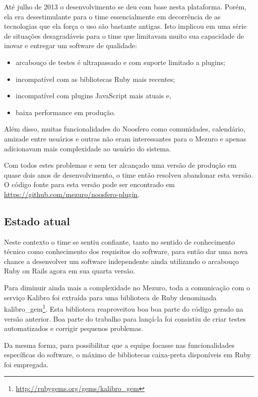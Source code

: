 \documentclass[12pt]{article}
\begin{document}
  Até julho de 2013 o desenvolvimento se deu com base nesta plataforma. Porém, ela era desestimulante para o time essencialmente em decorrência de as tecnologias que ela força o uso são bastante antigas. Isto implicou em uma série de situações desagradáveis para o time que limitavam muito sua capacidade de inovar e entregar um software de qualidade:

  \begin{itemize}
    \item arcabouço de testes é ultrapassado e com suporte limitado a plugins;
    \item incompatível com as bibliotecas Ruby mais recentes;
    \item incompatível com plugins JavaScript mais atuais e,
    \item baixa performance em produção.
  \end{itemize}

  Além disso, muitas funcionalidades do Noosfero como comunidades, calendário, amizade entre usuários e outras não eram interessantes para o Mezuro e apenas adicionavam mais complexidade ao usuário do sistema.

  Com todos estes problemas e sem ter alcançado uma versão de produção em quase dois anos de desenvolvimento, o time então resolveu abandonar esta versão. O código fonte para esta versão pode ser encontrado em \url{https://github.com/mezuro/noosfero-plugin}.

  \subsection{Estado atual} \label{subsec:estado-atual}
  Neste contexto o time se sentiu confiante, tanto no sentido de conhecimento técnico como conhecimento dos requisitos do software, para então dar uma nova chance a desenvolver um software independente ainda utilizando o arcabouço Ruby on Rails agora em sua quarta versão.

  Para diminuir ainda mais a complexidade no Mezuro, toda a comunicação com o serviço Kalibro foi extraída para uma biblioteca de Ruby denominada kalibro\_gem\footnote{\url{http://rubygems.org/gems/kalibro_gem}}. Esta biblioteca reaproveitou boa boa parte do código gerado na versão anterior. Boa parte do trabalho para lançá-la foi consistiu de criar testes automatizados e corrigir pequenos problemas.

  Da mesma forma, para possibilitar que a equipe focasse nas funcionalidades específicas do software, o máximo de bibliotecas caixa-preta disponíveis em Ruby foi empregada.
\end{document}
